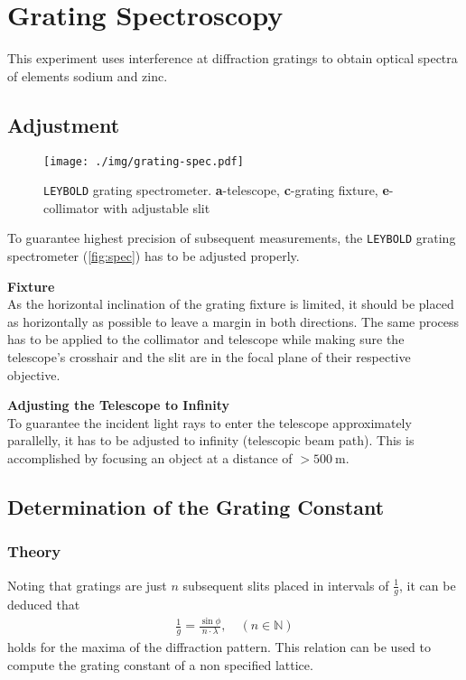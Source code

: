 \newcommand{\darc}[2]{\SI{#1}{\degree}\SI{#2}{\arcminute}}

\chapter{Grating Spectroscopy}
This experiment uses interference at diffraction gratings to obtain optical spectra of elements sodium and zinc.

\section{Adjustment}
\begin{figure}
	\centering
	\texttt{[image: ./img/grating-spec.pdf]}
	\caption[\texttt{LEYBOLD} grating spectrometer]{\texttt{LEYBOLD} grating spectrometer. \textbf{a}-telescope, \textbf{c}-grating fixture, \textbf{e}-collimator with adjustable slit}
	\label{fig:spec}
\end{figure}
To guarantee highest precision of subsequent measurements, the \texttt{LEYBOLD} grating spectrometer (\autoref{fig:spec}) has to be adjusted properly.

\textbf{Fixture}\\
As the horizontal inclination of the grating fixture is limited, it should be placed as horizontally as possible to leave a margin in both directions.
The same process has to be applied to the collimator and telescope while making sure the telescope's crosshair and the slit are in the focal plane of their respective objective.

\textbf{Adjusting the Telescope to Infinity}\\
To guarantee the incident light rays to enter the telescope approximately parallelly, it has to be adjusted to infinity (telescopic beam path).
This is accomplished by focusing an object at a distance of $>\SI{500}{\meter}$.

\section{Determination of the Grating Constant}\label{sec:grating}
\subsection{Theory}
Noting that gratings are just $n$ subsequent slits placed in intervals of $\frac{1}{g}$, it can be deduced that
\begin{align}
	\frac{1}{g}=\frac{\sin\phi}{n\cdot\lambda},\quad(n\in\mathbb{N}) \label{eq:grating-const}
\end{align}
holds for the maxima of the diffraction pattern.
This relation can be used to compute the grating constant of a non specified lattice.
